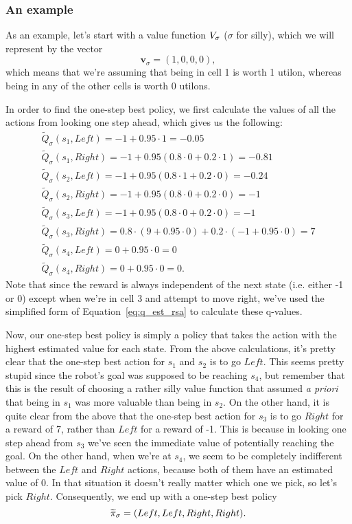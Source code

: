\documentclass[a4paper]{article}
\begin{document}
\subsubsection{An example}
As an example, let's start with a value function $V_\sigma$
($\sigma$ for silly),
which we will represent by the vector
\begin{equation*}
  \mathbf{v}_\sigma = (1, 0, 0, 0) ,
\end{equation*}
which means that we're assuming that being in cell 1 is worth 1 utilon, whereas
being in any of the other cells is worth 0 utilons.

In order to find the one-step best policy, we first calculate the values
of all the actions from looking one step ahead, which gives us the following:
\begin{gather*}
  \widetilde{Q}_\sigma(s_1, Left)  = -1 + 0.95 \cdot 1 = -0.05 \\
  \widetilde{Q}_\sigma(s_1, Right) = -1 + 0.95 (0.8 \cdot 0 + 0.2 \cdot 1) = -0.81 \\
  \widetilde{Q}_\sigma(s_2, Left)  = -1 + 0.95 (0.8 \cdot 1 + 0.2 \cdot 0) = -0.24 \\
  \widetilde{Q}_\sigma(s_2, Right) = -1 + 0.95 (0.8 \cdot 0 + 0.2 \cdot 0) = -1 \\
  \widetilde{Q}_\sigma(s_3, Left)  = -1 + 0.95 (0.8 \cdot 0 + 0.2 \cdot 0) = -1 \\
  \widetilde{Q}_\sigma(s_3, Right) = 0.8 \cdot (9 + 0.95 \cdot 0) + 0.2 \cdot (-1 + 0.95 \cdot 0) = 7 \\
  \widetilde{Q}_\sigma(s_4, Left)  = 0 + 0.95 \cdot 0 = 0 \\
  \widetilde{Q}_\sigma(s_4, Right) = 0 + 0.95 \cdot 0 = 0 .
\end{gather*}
Note that since the reward is always independent of the next state
(i.e. either -1 or 0)
except when we're in cell 3 and attempt to move right, we've used the simplified
form of Equation~\ref{eq:q_est_rsa} to calculate these q-values.

Now, our one-step best policy is simply a policy that takes the action with the
highest estimated value for each state.
From the above calculations, it's pretty clear that the one-step best action for
$s_1$ and $s_2$ is to go $Left$.
This seems pretty stupid since the robot's goal was supposed to be reaching
$s_4$,
but remember that this is the result of choosing a rather silly value function
that assumed \emph{a priori} that being in $s_1$ was more valuable than being
in $s_2$.
On the other hand, it is quite clear from the above that the one-step best
action for $s_3$ is to go $Right$ for a reward of 7, rather than $Left$
for a reward of -1.
This is because in looking one step ahead from $s_3$ we've seen the immediate
value of potentially reaching the goal.
On the other hand, when we're at $s_4$, we seem to be completely indifferent
between the $Left$ and $Right$ actions, because both of them have an estimated
value of 0.
In that situation it doesn't really matter which one we pick,
so let's pick $Right$.
Consequently, we end up with a one-step best policy
\begin{equation*}
  \widetilde{\pi}_\sigma = (Left, Left, Right, Right) .
\end{equation*}
\end{document}
